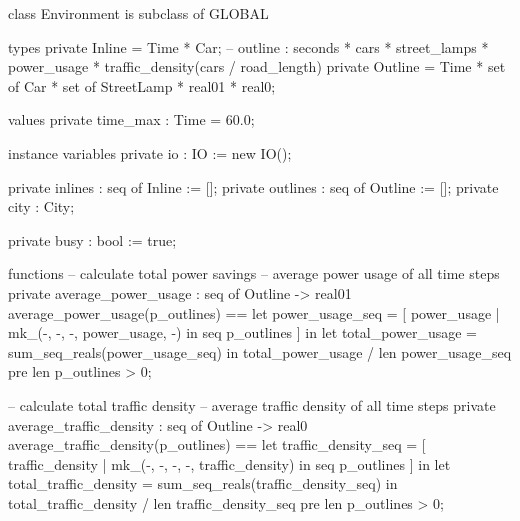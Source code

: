\documentclass[a4paper]{article}
\begin{document}
\title{}
\author{}
\begin{vdm_al}
class Environment is subclass of GLOBAL

types
    private Inline = Time * Car;
    -- outline : seconds * cars * street_lamps * power_usage * traffic_density(cars / road_length)
    private Outline = Time * set of Car * set of StreetLamp * real01 * real0;

values
    private time_max : Time = 60.0;

instance variables
    private io : IO := new IO();

    private inlines : seq of Inline := [];
    private outlines : seq of Outline := [];
    private city : City;
    
    private busy : bool := true;

functions
    -- calculate total power savings
    -- average power usage of all time steps
    private average_power_usage : seq of Outline -> real01
    average_power_usage(p_outlines) ==
        let power_usage_seq = [
            power_usage
            | mk_(-, -, -, power_usage, -) in seq p_outlines
        ] in
            let total_power_usage = sum_seq_reals(power_usage_seq) in
                total_power_usage / len power_usage_seq
    pre len p_outlines > 0;

    -- calculate total traffic density
    -- average traffic density of all time steps
    private average_traffic_density : seq of Outline -> real0
    average_traffic_density(p_outlines) ==
        let traffic_density_seq = [
            traffic_density
            | mk_(-, -, -, -, traffic_density) in seq p_outlines
        ] in
            let total_traffic_density = sum_seq_reals(traffic_density_seq) in
                total_traffic_density / len traffic_density_seq
    pre len p_outlines > 0;


\end{vdm_al}
\end{document}
